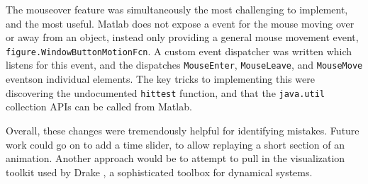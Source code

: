 \documentclass[main.tex]{subfiles}
\begin{document}
	The mouseover feature was simultaneously the most challenging to implement, and the most useful.
	Matlab does not expose a event for the mouse moving over or away from an object, instead only providing a general mouse movement event, \texttt{figure.WindowButtonMotionFcn}.
	A custom event dispatcher was written which listens for this event, and the dispatches \texttt{MouseEnter}, \texttt{MouseLeave}, and \texttt{MouseMove} events\footnotemark on individual elements.
	The key tricks to implementing this were discovering the undocumented \texttt{hittest} function\cite{matlab-hittest}, and that the \texttt{java.util} collection APIs can be called from Matlab.


	Overall, these changes were tremendously helpful for identifying mistakes.
	Future work could go on to add a time slider, to allow replaying a short section of an animation. Another approach would be to attempt to pull in the visualization toolkit used by Drake \cite{drake}, a sophisticated toolbox for dynamical systems.


\bib
\end{document}
